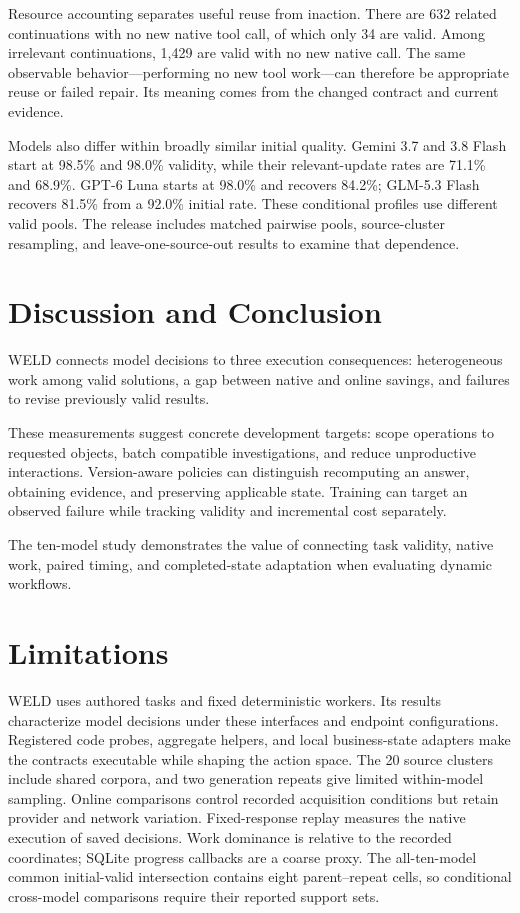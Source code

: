 \documentclass[11pt]{article}
\begin{document}
Resource accounting separates useful reuse from inaction. There are 632 related continuations with no new native tool call, of which only 34 are valid. Among irrelevant continuations, 1,429 are valid with no new native call. The same observable behavior---performing no new tool work---can therefore be appropriate reuse or failed repair. Its meaning comes from the changed contract and current evidence.

Models also differ within broadly similar initial quality. Gemini 3.7 and 3.8 Flash start at 98.5\% and 98.0\% validity, while their relevant-update rates are 71.1\% and 68.9\%. GPT-6 Luna starts at 98.0\% and recovers 84.2\%; GLM-5.3 Flash recovers 81.5\% from a 92.0\% initial rate. These conditional profiles use different valid pools. The release includes matched pairwise pools, source-cluster resampling, and leave-one-source-out results to examine that dependence.

\section{Discussion and Conclusion}
WELD connects model decisions to three execution consequences: heterogeneous work among valid solutions, a gap between native and online savings, and failures to revise previously valid results.

These measurements suggest concrete development targets: scope operations to requested objects, batch compatible investigations, and reduce unproductive interactions. Version-aware policies can distinguish recomputing an answer, obtaining evidence, and preserving applicable state. Training can target an observed failure while tracking validity and incremental cost separately.

The ten-model study demonstrates the value of connecting task validity, native work, paired timing, and completed-state adaptation when evaluating dynamic workflows.

\section*{Limitations}
WELD uses authored tasks and fixed deterministic workers. Its results characterize model decisions under these interfaces and endpoint configurations. Registered code probes, aggregate helpers, and local business-state adapters make the contracts executable while shaping the action space. The 20 source clusters include shared corpora, and two generation repeats give limited within-model sampling. Online comparisons control recorded acquisition conditions but retain provider and network variation. Fixed-response replay measures the native execution of saved decisions. Work dominance is relative to the recorded coordinates; SQLite progress callbacks are a coarse proxy. The all-ten-model common initial-valid intersection contains eight parent--repeat cells, so conditional cross-model comparisons require their reported support sets.
\end{document}
